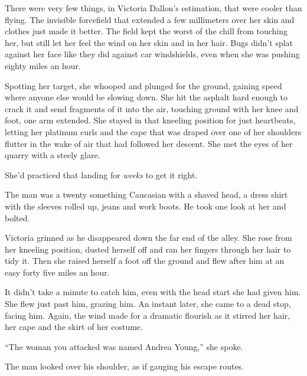 





There were very few things, in Victoria Dallon's estimation, that were cooler than flying.  The invisible forcefield that extended a few millimeters over her skin and clothes just made it better.  The field kept the worst of the chill from touching her, but still let her feel the wind on her skin and in her hair.  Bugs didn't splat against her face like they did against car windshields, even when she was pushing eighty miles an hour.



Spotting her target, she whooped and plunged for the ground, gaining speed where anyone else would be slowing down.  She hit the asphalt hard enough to crack it and send fragments of it into the air, touching ground with her knee and foot, one arm extended.  She stayed in that kneeling position for just heartbeats, letting her platinum curls and the cape that was draped over one of her shoulders flutter in the wake of air that had followed her descent.  She met the eyes of her quarry with a steely glare.



She'd practiced that landing for \emph{weeks} to get it right.



The man was a twenty something Caucasian with a shaved head, a dress shirt with the sleeves rolled up, jeans and work boots.  He took one look at her and bolted.



Victoria grinned as he disappeared down the far end of the alley.  She rose from her kneeling position, dusted herself off and ran her fingers through her hair to tidy it.  Then she raised herself a foot off the ground and flew after him at an easy forty five miles an hour.



It didn't take a minute to catch him, even with the head start she had given him.  She flew just past him, grazing him.  An instant later, she came to a dead stop, facing him.  Again, the wind made for a dramatic flourish as it stirred her hair, her cape and the skirt of her costume.



``The woman you attacked was named Andrea Young,'' she spoke.



The man looked over his shoulder, as if gauging his escape routes.



